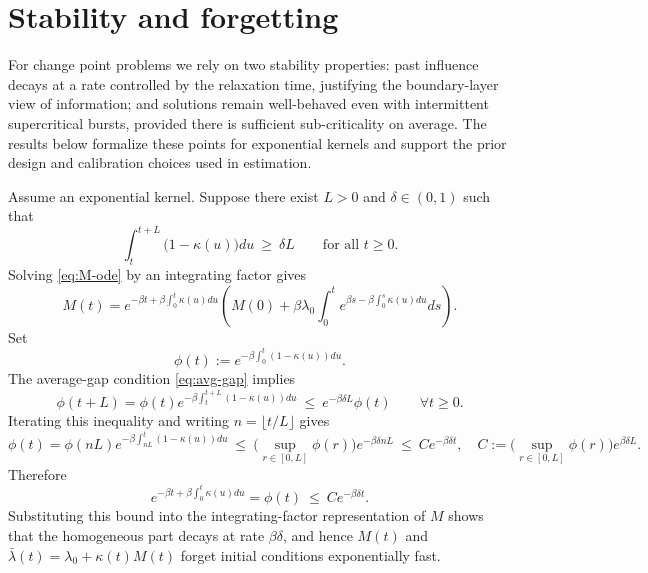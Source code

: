 \documentclass{article}
\theoremstyle{plain}
\theoremstyle{definition}
\newcommand{\1}{\mathbf{1}}
\begin{document}
    \section{Stability and forgetting}
    \label{sec:stability}
    
    For change point problems we rely on two stability properties: past influence decays at a rate controlled by the relaxation time, justifying the boundary-layer view of information; and solutions remain well-behaved even with intermittent supercritical bursts, provided there is sufficient sub-criticality on average. The results below formalize these points for exponential kernels and support the prior design and calibration choices used in estimation.
    
    Assume an exponential kernel. Suppose there exist $L>0$ and $\delta\in(0,1)$ such that
    \begin{equation}
    \label{eq:avg-gap}
    \int_t^{t+L}\big(1-\kappa(u)\big) du\ \ge\ \delta L\qquad\text{for all }t\ge 0.
    \end{equation}
    Solving \eqref{eq:M-ode} by an integrating factor gives
    \[
    M(t)=e^{-\beta t+\beta\int_0^t \kappa(u) du}\left(
    M(0)+\beta\lambda_0\int_0^t e^{\beta s-\beta\int_0^s \kappa(u) du} ds\right).
    \]
    Set
    \[
    \phi(t):=e^{-\beta\int_0^t (1-\kappa(u)) du}.
    \]
    The average-gap condition \eqref{eq:avg-gap} implies
    \[
    \phi(t+L)=\phi(t) e^{-\beta\int_t^{t+L}(1-\kappa(u)) du}\ \le\ e^{-\beta\delta L} \phi(t)\qquad\forall t\ge 0.
    \]
    Iterating this inequality and writing $n=\lfloor t/L\rfloor$ gives
    \[
    \phi(t)=\phi(nL) e^{-\beta\int_{nL}^t(1-\kappa(u)) du}
    \ \le\ \Big(\sup_{r\in[0,L]}\phi(r)\Big) e^{-\beta\delta nL}
    \ \le\ C e^{-\beta\delta t},
    \quad
    C:=\Big(\sup_{r\in[0,L]}\phi(r)\Big) e^{\beta\delta L}.
    \]
    Therefore
    \[
    e^{-\beta t+\beta\int_0^t \kappa(u) du}=\phi(t)\ \le\ C e^{-\beta\delta t}.
    \]
    Substituting this bound into the integrating-factor representation of $M$ shows that the homogeneous part decays at rate $\beta\delta$, and hence $M(t)$ and $\bar\lambda(t)=\lambda_0+\kappa(t)M(t)$ forget initial conditions exponentially fast.
    
\end{document}
